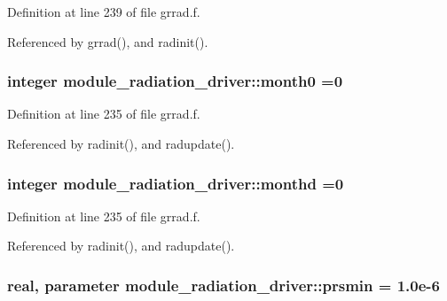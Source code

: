 Definition at line 239 of file grrad.\+f.



Referenced by grrad(), and radinit().

\subsubsection[{\texorpdfstring{month0}{month0}}]{\setlength{\rightskip}{0pt plus 5cm}integer module\+\_\+radiation\+\_\+driver\+::month0 =0\hspace{0.3cm}{\ttfamily [private]}}\hypertarget{namespacemodule__radiation__driver_a6eb268f296c77047f389ed6fac5f95be}{}\label{namespacemodule__radiation__driver_a6eb268f296c77047f389ed6fac5f95be}


Definition at line 235 of file grrad.\+f.



Referenced by radinit(), and radupdate().

\subsubsection[{\texorpdfstring{monthd}{monthd}}]{\setlength{\rightskip}{0pt plus 5cm}integer module\+\_\+radiation\+\_\+driver\+::monthd =0\hspace{0.3cm}{\ttfamily [private]}}\hypertarget{namespacemodule__radiation__driver_ac4baf8ff048aaa5b85d03cc42c579c7b}{}\label{namespacemodule__radiation__driver_ac4baf8ff048aaa5b85d03cc42c579c7b}


Definition at line 235 of file grrad.\+f.



Referenced by radinit(), and radupdate().

\subsubsection[{\texorpdfstring{prsmin}{prsmin}}]{\setlength{\rightskip}{0pt plus 5cm}real, parameter module\+\_\+radiation\+\_\+driver\+::prsmin = 1.\+0e-\/6\hspace{0.3cm}{\ttfamily [private]}}\hypertarget{namespacemodule__radiation__driver_a3fc43ca0d2c5f69a380ddb4f0926ecc7}{}\label{namespacemodule__radiation__driver_a3fc43ca0d2c5f69a380ddb4f0926ecc7}


